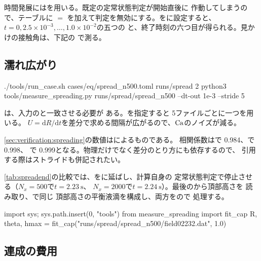 時間発展にはを用いる。既定の定常状態判定が開始直後に
作動してしまうので、\code{[Numerics]}テーブルに $=$
を加えて判定を無効にする。をに設定すると、
$t = 0, 2.5\times10^{-3}, \dots, 1.0\times10^{-2}$の五つの
と、終了時刻の六つ目が得られる。見かけの接触角は、下記の
で測る。

\subsection{濡れ広がり}

\begin{shell}
./tools/run_case.sh cases/eq/spread_n500.toml runs/spread 2
python3 tools/measure_spreading.py runs/spread/spread_n500 --dt-out 1e-3 --stride 5
\end{shell}

は、入力のと一致させる必要が
ある。を指定すると 5ファイルごとに一つを用いる。
$U = \mathrm{d}R/\mathrm{d}t$を差分で求める間隔が広がるので、$\mathrm{Ca}$のノイズが減る。

\begin{note}[相関係数はストライドに依存する]
  \cref{sec:verification:spreading}の数値はによるものである。
  相関係数はで 0.984、で 0.998、
  で 0.999となる。物理だけでなく差分のとり方にも依存するので、
  引用する際はストライドも併記されたい。
\end{note}

\cref{tab:spreadend}の比較では、をに延ばし、計算自身の
定常状態判定で停止させる（$N_x = 500$で$t = \SI{2.23}{\second}$、
$N_x = 2000$で$t = \SI{2.24}{\second}$）。最後のから頂部高さを
読み取り、で同じ
頂部高さの平衡液滴を構成し、両方をので
処理する。

\begin{plain}
import sys; sys.path.insert(0, "tools")
from measure_spreading import fit_cap
R, theta, hmax = fit_cap("runs/spread/spread_n500/field02232.dat", 1.0)
\end{plain}

\subsection{連成の費用}

